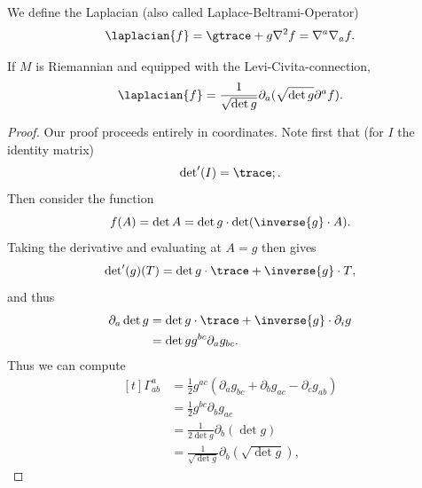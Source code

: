 \documentclass[titlepage,numbers=noenddot,oneside,%
cleardoublepage=empty,paper=a4,fontsize=11pt,%
english,%
]{scrartcl}
\begin{document}
\begin{definition}
    We define the Laplacian (also called Laplace-Beltrami-Operator)
    \begin{equation*}
        \laplacian{f}=\gtrace+{g}{\nabla^2 f}=\nabla^a \nabla_a f.
    \end{equation*}
\end{definition}
\begin{lemma}\label{lem:laplacian_in_terms_of_metric_determinant}
    If \( M \) is Riemannian and equipped with the Levi-Civita-connection,
    \begin{equation*}
        \laplacian{f}=\frac{1}{\sqrt{\det{g}}}\partial_{a}(\sqrt{\det{g}}\partial^a f).
    \end{equation*}    
\end{lemma}
\begin{proof}
    Our proof proceeds entirely in coordinates. Note first that (for \( I \) the identity matrix)
    \begin{equation*}
        \det\nolimits'(I)=\trace;.
    \end{equation*}
    Then consider the function
    \begin{equation*}
        f(A)=\det{A}=\det{g}\cdot \det(\inverse{g}\cdot A).
    \end{equation*}
    Taking the derivative and evaluating at \( A=g \) then gives
    \begin{equation*}
        \det\nolimits'(g)(T)=\det{g}\cdot \trace+{\inverse{g}\cdot T},
    \end{equation*}
    and thus
    \begin{equation*}
        \begin{aligned}[t]
            \partial_a \det{g}&=\det{g}\cdot \trace+{\inverse{g}\cdot \partial_i g}\\
            &=\det{g}g^{bc}\partial_{a}g_{bc}.
        \end{aligned}
    \end{equation*}
    Thus we can compute
    \begin{equation*}
        \begin{aligned}[t]
            \Gamma^{a}_{ab}&=\frac{1}{2}g^{ac}(\partial_a g_{bc}+\partial_b g_{ac}-\partial_c g_{ab})\\
            &=\frac{1}{2}g^{bc}\partial_b g_{ac}\\
            &=\frac{1}{2\det{g}}\partial_b(\det{g})\\
            &=\frac{1}{\sqrt{\det{g}}}\partial_b(\sqrt{\det{g}}),
        \end{aligned}

\end{equation*}
\end{proof}
\end{document}
